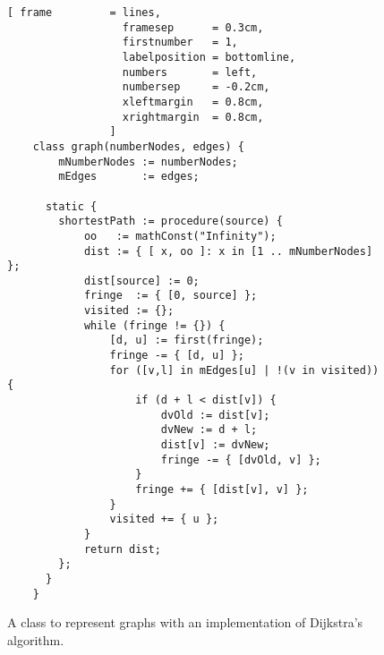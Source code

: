 \begin{figure}[!ht]
\centering
\begin{Verbatim}[ frame         = lines, 
                  framesep      = 0.3cm, 
                  firstnumber   = 1,
                  labelposition = bottomline,
                  numbers       = left,
                  numbersep     = -0.2cm,
                  xleftmargin   = 0.8cm,
                  xrightmargin  = 0.8cm,
                ]
    class graph(numberNodes, edges) {
        mNumberNodes := numberNodes;
        mEdges       := edges;
    
      static {
        shortestPath := procedure(source) {
            oo   := mathConst("Infinity");
            dist := { [ x, oo ]: x in [1 .. mNumberNodes] };
            dist[source] := 0;
            fringe  := { [0, source] };
            visited := {};
            while (fringe != {}) {
                [d, u] := first(fringe);
                fringe -= { [d, u] };
                for ([v,l] in mEdges[u] | !(v in visited)) {
                    if (d + l < dist[v]) {
                        dvOld := dist[v];
                        dvNew := d + l;
                        dist[v] := dvNew;
                        fringe -= { [dvOld, v] };
                    }
                    fringe += { [dist[v], v] };
                }
                visited += { u };
            }
            return dist;
        };
      }
    }
\end{Verbatim}
\vspace*{-0.3cm}
\caption{A class to represent graphs with an implementation of Dijkstra's algorithm.}
\label{fig:dijkstra.stlx}
\end{figure}

\vspace*{0.3cm}

